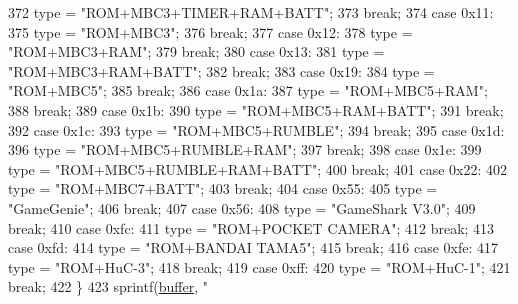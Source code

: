 \begin{DoxyCode}
{{{372     type = \textcolor{stringliteral}{"ROM+MBC3+TIMER+RAM+BATT"};
373     \textcolor{keywordflow}{break};
374   \textcolor{keywordflow}{case} 0x11:
375     type = \textcolor{stringliteral}{"ROM+MBC3"};
376     \textcolor{keywordflow}{break};
377   \textcolor{keywordflow}{case} 0x12:
378     type = \textcolor{stringliteral}{"ROM+MBC3+RAM"};
379     \textcolor{keywordflow}{break};
380   \textcolor{keywordflow}{case} 0x13:
381     type = \textcolor{stringliteral}{"ROM+MBC3+RAM+BATT"};
382     \textcolor{keywordflow}{break};
383   \textcolor{keywordflow}{case} 0x19:
384     type = \textcolor{stringliteral}{"ROM+MBC5"};
385     \textcolor{keywordflow}{break};
386   \textcolor{keywordflow}{case} 0x1a:
387     type = \textcolor{stringliteral}{"ROM+MBC5+RAM"};
388     \textcolor{keywordflow}{break};
389   \textcolor{keywordflow}{case} 0x1b:
390     type = \textcolor{stringliteral}{"ROM+MBC5+RAM+BATT"};
391     \textcolor{keywordflow}{break};
392   \textcolor{keywordflow}{case} 0x1c:
393     type = \textcolor{stringliteral}{"ROM+MBC5+RUMBLE"};
394     \textcolor{keywordflow}{break};
395   \textcolor{keywordflow}{case} 0x1d:
396     type = \textcolor{stringliteral}{"ROM+MBC5+RUMBLE+RAM"};
397     \textcolor{keywordflow}{break};
398   \textcolor{keywordflow}{case} 0x1e:
399     type = \textcolor{stringliteral}{"ROM+MBC5+RUMBLE+RAM+BATT"};
400     \textcolor{keywordflow}{break};
401   \textcolor{keywordflow}{case} 0x22:
402     type = \textcolor{stringliteral}{"ROM+MBC7+BATT"};
403     \textcolor{keywordflow}{break};
404   \textcolor{keywordflow}{case} 0x55:
405     type = \textcolor{stringliteral}{"GameGenie"};
406     \textcolor{keywordflow}{break};
407   \textcolor{keywordflow}{case} 0x56:
408     type = \textcolor{stringliteral}{"GameShark V3.0"};
409     \textcolor{keywordflow}{break};
410   \textcolor{keywordflow}{case} 0xfc:
411     type = \textcolor{stringliteral}{"ROM+POCKET CAMERA"};
412     \textcolor{keywordflow}{break};
413   \textcolor{keywordflow}{case} 0xfd:
414     type = \textcolor{stringliteral}{"ROM+BANDAI TAMA5"};
415     \textcolor{keywordflow}{break};
416   \textcolor{keywordflow}{case} 0xfe:
417     type = \textcolor{stringliteral}{"ROM+HuC-3"};
418     \textcolor{keywordflow}{break};
419   \textcolor{keywordflow}{case} 0xff:
420     type = \textcolor{stringliteral}{"ROM+HuC-1"};
421     \textcolor{keywordflow}{break};
422   \}
423   sprintf(\mbox{\hyperlink{_g_b_a_8cpp_a28d4d3d8445e73a696b2d6f7eadabd96}{buffer}}, \textcolor{stringliteral}{"%
}}}}
\end{DoxyCode}
